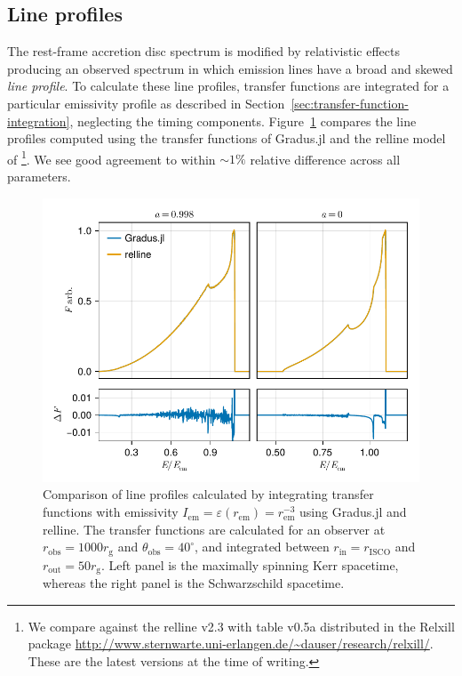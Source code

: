 \documentclass[fleqn,usenatbib]{mnras}
\newcommand{\software}[1]{{\sc #1}}
\newcommand{\Gradus}{\software{Gradus.jl}\xspace}
\newcommand{\relline}{\software{relline}\xspace}
\newcommand{\rg}{r_\text{g}}
\newcommand{\risco}{r_\text{ISCO}}
\newcommand{\rhoem}{r_\text{em}}
\begin{document}
\subsection{Line profiles}

The rest-frame accretion disc spectrum is modified by relativistic effects
producing an observed spectrum in which emission lines have a broad and skewed
\emph{line profile}.  To calculate these line profiles, transfer functions are
integrated for a particular emissivity profile as described in
Section~\ref{sec:transfer-function-integration}, neglecting the timing
components. Figure~\ref{fig:relline-comparison} compares the line profiles
computed using the transfer functions of \Gradus and the \relline model of
\cite{dauser_broad_2010}\footnote{We compare against the \relline v2.3 with
    table v0.5a distributed in the Relxill package
    \url{http://www.sternwarte.uni-erlangen.de/~dauser/research/relxill/}. These
are the latest versions at the time of writing.}. We see good agreement to
within $\sim 1\%$ relative difference across all parameters.

\begin{figure}
    \centering
    \includegraphics[width=0.99\columnwidth]{figures/lineprofiles.comparison.pdf}
    \caption{Comparison of line profiles calculated by integrating transfer
        functions with emissivity $I_\text{em} = \varepsilon(\rhoem) =
        \rhoem^{-3}$ using \Gradus and \relline. The transfer functions are
        calculated for an observer at $r_\text{obs} = 1000\rg$ and
        $\theta_\text{obs} = 40^\circ$, and integrated between $r_\text{in} =
        \risco$ and $r_\text{out} = 50 \rg$. Left panel is the maximally
        spinning Kerr spacetime, whereas the right panel is the Schwarzschild
        spacetime.}
    \label{fig:relline-comparison}
\end{figure}
\end{document}

